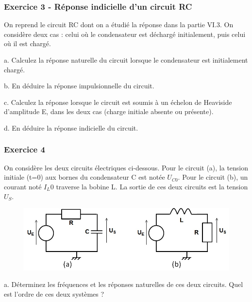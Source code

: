 	\vspace{1\baselineskip} 
	
	
	\subsubsection{Exercice 3 - Réponse indicielle d'un circuit RC}
	
	On reprend le circuit RC dont on a étudié la réponse dans la partie VI.3. On considère deux cas : celui où le condensateur est déchargé initialement, puis celui où il est chargé. 
	
	a. Calculez la réponse naturelle du circuit lorsque le condensateur est initialement chargé.
	
	b. En déduire la réponse impulsionnelle du circuit.
	
	c. Calculez la réponse lorsque le circuit est soumis à un échelon de Heaviside d'amplitude E, dans les deux cas (charge initiale absente ou présente).
	
	d. En déduire la réponse indicielle du circuit.
	
	\vspace{1\baselineskip}	
	

	
	\subsubsection{Exercice 4}
	
	On considère les deux circuits électriques ci-dessous. Pour le circuit (a), la tension initiale (t=0) aux bornes du condensateur C est notée $U_{C0}$. Pour le circuit (b), un courant noté $I_L0$ traverse la bobine L. La sortie de ces deux circuits est la tension $U_{S}$.
	
	\begin{figure}[h!]
		\centering
		\includegraphics[scale=0.5]{images/Exo_2_4.jpg} 
	\end{figure} 
	
	a. Déterminez les fréquences et les réponses naturelles de ces deux circuits. Quel est l'ordre de ces deux systèmes ? 
	
